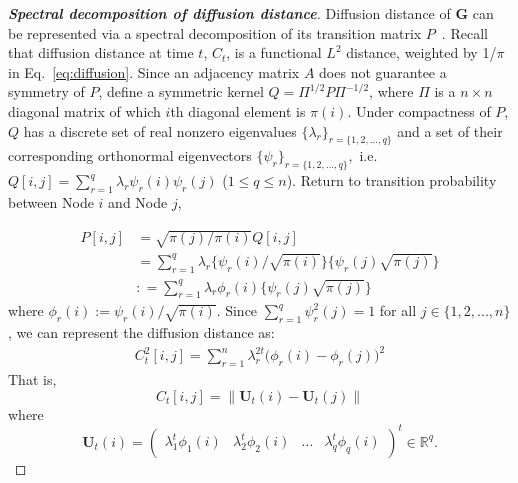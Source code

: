 \documentclass[12pt]{article}
\theoremstyle{definition}
\begin{document}
\begin{proof}[\textbf{Spectral decomposition of diffusion distance}]
Diffusion distance of $\mathbf{G}$ can be represented via a spectral decomposition of its transition matrix $P$~\citep{coifman2006diffusion,lafon2006diffusion}. Recall that diffusion distance at time $t$, $C_{t}$, is a functional $L^2$ distance, weighted by 1/$\pi$ in Eq.~\ref{eq:diffusion}. Since an adjacency matrix $A$ does not guarantee a symmetry of $P$, define a symmetric kernel $Q = \Pi^{1/2} P \Pi^{-1/2}$, where $\Pi$ is a $n \times n$ diagonal matrix of which $i$th diagonal element is $\pi(i)$. Under compactness of $P$, $Q$ has a discrete set of real nonzero eigenvalues $\{ \lambda_{r} \}_{r = \{1,2,...,q \}}$ and a set of their corresponding orthonormal eigenvectors $\{ \psi_{r} \}_{r = \{1,2,..., q \} },$ i.e. $Q[i,j] = \sum\limits_{r=1}^{q} \lambda_{r} \psi_{r}(i) \psi_{r}(j)$ ($1 \leq q \leq n$).  Return to transition probability between Node $i$ and Node $j$,

\begin{equation}
\begin{split}
P[i,j] &  = \sqrt{\pi(j) / \pi(i) } Q[i,j] \\ &   = \sum\limits_{r=1}^{q} \lambda_{r} \big\{ \psi_{r}(i) / \sqrt{\pi(i)}  \big\} \big\{ \psi_{r}(j) \sqrt{\pi(j)} \big\}  \\ & : = \sum\limits_{r=1}^{q} \lambda_{r} \phi_{r}(i) \big\{ \psi_{r}(j) \sqrt{\pi(j)} \big\}
\end{split}
\end{equation}
where $\phi_{r}(i) := \psi_{r}(i) / \sqrt{\pi(i)}$. Since $\sum\limits_{r=1}^{q} \psi^2_{r}(j) = 1$ for all $j \in \{1,2,...,n\}$, we can represent the diffusion distance as: 	
\begin{equation}
\begin{split}
C^2_{t}[i,j]  = \sum\limits_{r=1}^{n} \lambda^{2t}_{r} \big( \phi_{r} (i) - \phi_{r}(j)   \big)^2  
\end{split}
\end{equation}
That is,
\begin{equation}
C_{t}[i,j] = \parallel \mathbf{U}_{t}(i) - \mathbf{U}_{t}(j) \parallel
\end{equation}
where 
\begin{equation} 
\mathbf{U}_{t}(i) = \begin{pmatrix} \lambda^{t}_{1} \phi_{1}(i) & \lambda^{t}_{2} \phi_{2} (i)  & \ldots & \lambda^{t}_{q} \phi_{q}(i) \end{pmatrix}^{t} \in \mathbb{R}^{q}.
\end{equation}

\end{proof}	
	
\end{document}
